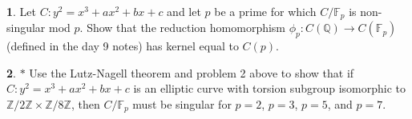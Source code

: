 \documentclass[12pt]{article}
\theoremstyle{definition}
\newtheorem{ex}{}
\begin{document}
\begin{ex}
	Let $C : y^{2} = x^{3} + ax^{2} + bx + c$ and let $p$ be a prime
	for which $C/\mathbb{F}_{p}$ is non-singular mod $p$. Show that the reduction homomorphism
	$\phi_{p} : C(\mathbb{Q}) \to C(\mathbb{F}_{p})$ (defined in the day 9 notes) has kernel equal to
	$C(p)$.
\end{ex}

\begin{ex}
	$*$ Use the Lutz-Nagell theorem and problem 2 above to show that if $C : y^{2} = x^{3} + ax^{2} + bx + c$ is an elliptic curve with torsion subgroup isomorphic to $\mathbb{Z}/2\mathbb{Z} \times \mathbb{Z}/8\mathbb{Z}$,
	then $C/\mathbb{F}_{p}$ must be singular for $p = 2$, $p = 3$, $p = 5$, and $p = 7$.
\end{ex}
\end{document}
